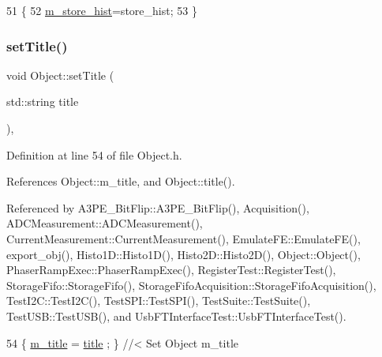 \begin{DoxyCode}
51                                      \{
52     \hyperlink{classAcquisition_a08f70edd83751dbdab4c8190dc4b9188}{m\_store\_hist}=store\_hist;
53   \}
\end{DoxyCode}
\mbox{\label{classObject_a89557dbbad5bcaa02652f5d7fa35d20f}} 
\subsubsection{\texorpdfstring{set\+Title()}{setTitle()}}
{\footnotesize\ttfamily void Object\+::set\+Title (\begin{DoxyParamCaption}\item[{std\+::string}]{title }\end{DoxyParamCaption})\hspace{0.3cm}{\ttfamily [inline]}, {\ttfamily [inherited]}}



Definition at line 54 of file Object.\+h.



References Object\+::m\+\_\+title, and Object\+::title().



Referenced by A3\+P\+E\+\_\+\+Bit\+Flip\+::\+A3\+P\+E\+\_\+\+Bit\+Flip(), Acquisition(), A\+D\+C\+Measurement\+::\+A\+D\+C\+Measurement(), Current\+Measurement\+::\+Current\+Measurement(), Emulate\+F\+E\+::\+Emulate\+F\+E(), export\+\_\+obj(), Histo1\+D\+::\+Histo1\+D(), Histo2\+D\+::\+Histo2\+D(), Object\+::\+Object(), Phaser\+Ramp\+Exec\+::\+Phaser\+Ramp\+Exec(), Register\+Test\+::\+Register\+Test(), Storage\+Fifo\+::\+Storage\+Fifo(), Storage\+Fifo\+Acquisition\+::\+Storage\+Fifo\+Acquisition(), Test\+I2\+C\+::\+Test\+I2\+C(), Test\+S\+P\+I\+::\+Test\+S\+P\+I(), Test\+Suite\+::\+Test\+Suite(), Test\+U\+S\+B\+::\+Test\+U\+S\+B(), and Usb\+F\+T\+Interface\+Test\+::\+Usb\+F\+T\+Interface\+Test().


\begin{DoxyCode}
54 \{ \hyperlink{classObject_affbeea1953eb5163573b92fad8f75727}{m\_title} = \hyperlink{classObject_a73a0f1a41828fdd8303dd662446fb6c3}{title} ; \} \textcolor{comment}{//< Set Object m\_title}
\end{DoxyCode}
\mbox{\label{classAcquisition_acdb167b43f3babb59a98698aa5c5066f}} 

